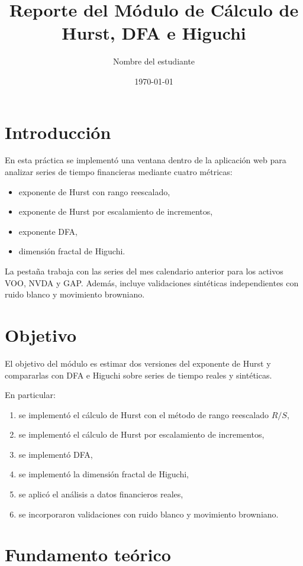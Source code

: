 \documentclass[12pt,a4paper]{article}
\title{Reporte del Módulo de Cálculo de Hurst, DFA e Higuchi}
\author{Nombre del estudiante}
\date{\today}
\begin{document}
\maketitle

\section{Introducción}

En esta práctica se implementó una ventana dentro de la aplicación web para analizar series de tiempo financieras mediante cuatro métricas:

\begin{itemize}
    \item exponente de Hurst con rango reescalado,
    \item exponente de Hurst por escalamiento de incrementos,
    \item exponente DFA,
    \item dimensión fractal de Higuchi.
\end{itemize}

La pestaña trabaja con las series del mes calendario anterior para los activos VOO, NVDA y GAP. Además, incluye validaciones sintéticas independientes con ruido blanco y movimiento browniano.

\section{Objetivo}

El objetivo del módulo es estimar dos versiones del exponente de Hurst y compararlas con DFA e Higuchi sobre series de tiempo reales y sintéticas.

En particular:

\begin{enumerate}
    \item se implementó el cálculo de Hurst con el método de rango reescalado \(R/S\),
    \item se implementó el cálculo de Hurst por escalamiento de incrementos,
    \item se implementó DFA,
    \item se implementó la dimensión fractal de Higuchi,
    \item se aplicó el análisis a datos financieros reales,
    \item se incorporaron validaciones con ruido blanco y movimiento browniano.
\end{enumerate}

\section{Fundamento teórico}
\end{document}
